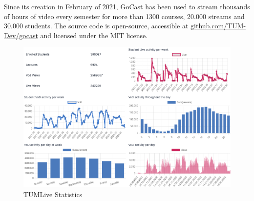 Since its creation in February of 2021, GoCast has been used to stream thousands of hours of video every semester for more than 1300 courses, 20.000 streams and 30.000 students. The source code is open-source, accessible at \href{https://github.com/TUM-Dev/gocast}{github.com/TUM-Dev/gocast} and licensed under the MIT license.

\begin{figure}[htpb]
    \centering
    \includegraphics[width=\linewidth]{images/TUMLiveStats.png}
    \caption[TUMLive Statistics]{TUMLive Statistics}\label{fig:tumlive-stats}
\end{figure}
